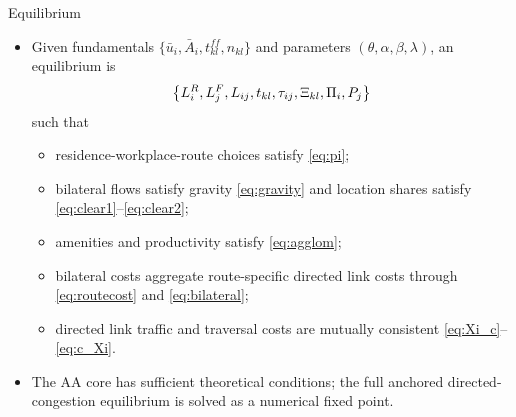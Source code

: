 \documentclass[11pt,aspectratio=169]{beamer}
\newcommand{\app}[1]{\allowbreak\hspace{0.25em}\hyperlink{#1}{\beamergotobutton{details}}}
\begin{document}
\begin{frame}[label=equilibrium]{Equilibrium}
\begin{itemize}\footnotesize
  \item Given fundamentals $\{\bar u_i,\bar A_i,t_{kl}^{ff},n_{kl}\}$ and parameters $(\theta,\alpha,\beta,\lambda)$, an equilibrium is
  \vspace{-0.45em}\begin{equation}
    \left\{L_i^R,L_j^F,L_{ij},t_{kl},\tau_{ij},\Xi_{kl},\Pi_i,P_j\right\}
  \vspace{-0.55em}\end{equation}
  such that
  \begin{itemize}\scriptsize
    \item residence-workplace-route choices satisfy \eqref{eq:pi};
    \item bilateral flows satisfy gravity \eqref{eq:gravity} and location shares satisfy \eqref{eq:clear1}--\eqref{eq:clear2};
    \item amenities and productivity satisfy \eqref{eq:agglom};
    \item bilateral costs aggregate route-specific directed link costs through \eqref{eq:routecost} and \eqref{eq:bilateral};
    \item directed link traffic and traversal costs are mutually consistent \eqref{eq:Xi_c}--\eqref{eq:c_Xi}.
  \end{itemize}
  \item The AA core has sufficient theoretical conditions; the full anchored directed-congestion equilibrium is solved as a numerical fixed point. \app{appexist}
\end{itemize}
\end{frame}

\end{document}
